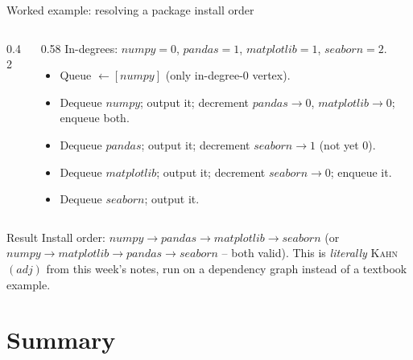 \documentclass[11pt,aspectratio=169]{beamer}
\begin{document}
\begin{frame}{Worked example: resolving a package install order}
  \begin{columns}
  \begin{column}{0.42\textwidth}
  \begin{center}
  \end{center}
  \end{column}
  \begin{column}{0.58\textwidth}
  \small
  In-degrees: $numpy{=}0$, $pandas{=}1$, $matplotlib{=}1$, $seaborn{=}2$.
  \begin{itemize}
    \item Queue $\gets [numpy]$ (only in-degree-0 vertex).
    \item Dequeue $numpy$; output it; decrement $pandas\to0$, $matplotlib\to0$; enqueue
    both.
    \item Dequeue $pandas$; output it; decrement $seaborn\to1$ (not yet $0$).
    \item Dequeue $matplotlib$; output it; decrement $seaborn\to0$; enqueue it.
    \item Dequeue $seaborn$; output it.
  \end{itemize}
  \end{column}
  \end{columns}
  \begin{exampleblock}{Result}
    \small Install order: $numpy \to pandas \to matplotlib \to seaborn$ (or $numpy \to
    matplotlib \to pandas \to seaborn$ -- both valid). This is \emph{literally}
    \textsc{Kahn}$(adj)$ from this week's notes, run on a dependency graph instead of
    a textbook example.
  \end{exampleblock}
\end{frame}

\section{Summary}
\end{document}

